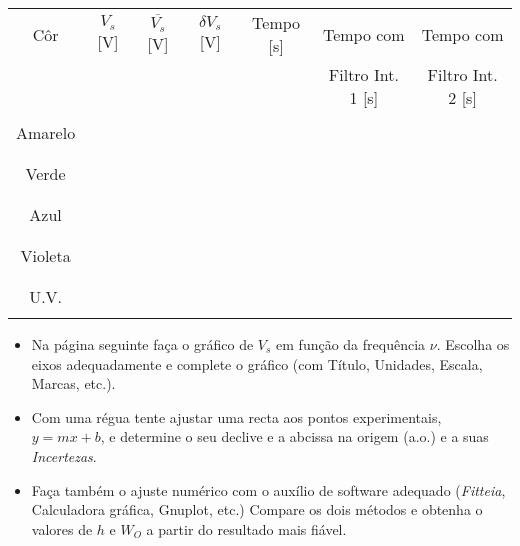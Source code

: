 \documentclass[a4paper,12pt]{article}  %
\begin{document}
\begin{center}
	\begin{tabular}{|c|c|c|c|c|c|c|}
	\hline
	Côr  & $V_s$ [V] & $\overline{V_s}$ [V]	& $\delta V_s$ [V] & Tempo [s] & Tempo com  & Tempo com\\
	  & & & &  & Filtro Int. 1 [s] & Filtro Int. 2 [s]\\
	\hline
	 &  &  &  &  &  & \\ \cline{2-2}
	Amarelo &  & & &  & &  \\ \cline{2-2}
	 &  &  &  &  &  & \\ 
	\hline
	 &  &  &  &  &  & \\ \cline{2-2}
	Verde & & & &  & &\\ \cline{2-2}
	 &  &  &  &  &  & \\ 
	\hline
	 &  &  &  &  &  & \\ \cline{2-2}
	Azul & & & &  & &\\ \cline{2-2}
	 &  &  &  &  &  & \\ 
	\hline
	 &  &  &  &  &  & \\ \cline{2-2}
	Violeta & & & &  & & \\ \cline{2-2}
	 &  &  &  &  &  & \\ 
	\hline
	 &  &  &  &  &  & \\ \cline{2-2}
	U.V. & & & &  & & \\ \cline{2-2}
	 &  &  &  &  &  & \\ 
	\hline
 	\end{tabular}
\end{center}

\begin{itemize}
\item  Na página seguinte faça o gráfico de $V_s$ em função da frequência $\nu$. Escolha os eixos adequadamente e complete o gráfico (com Título, Unidades, Escala, Marcas, etc.). 
\item Com uma régua tente  ajustar  uma recta aos pontos experimentais, $y=mx + b$, e determine o seu declive e a  abcissa na origem (a.o.) e a suas \emph{Incertezas}.
\item Faça também o ajuste numérico com o auxílio de software adequado (\emph{Fitteia}, Calculadora gráfica, Gnuplot, etc.) 
Compare os dois métodos e obtenha o valores de $h$ e $W_O$ a partir do resultado mais fiável.  
\end{itemize}
\end{document}
